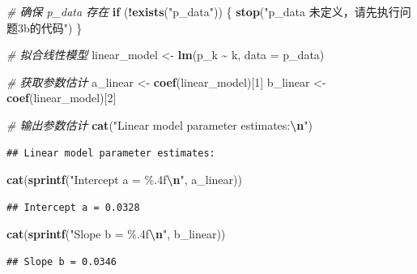 \documentclass[
]{article}
\newenvironment{Shaded}{\begin{snugshade}}{\end{snugshade}}
\newcommand{\AttributeTok}[1]{\textcolor[rgb]{0.13,0.29,0.53}{#1}}
\newcommand{\CommentTok}[1]{\textcolor[rgb]{0.56,0.35,0.01}{\textit{#1}}}
\newcommand{\ControlFlowTok}[1]{\textcolor[rgb]{0.13,0.29,0.53}{\textbf{#1}}}
\newcommand{\DecValTok}[1]{\textcolor[rgb]{0.00,0.00,0.81}{#1}}
\newcommand{\FunctionTok}[1]{\textcolor[rgb]{0.13,0.29,0.53}{\textbf{#1}}}
\newcommand{\NormalTok}[1]{#1}
\newcommand{\OtherTok}[1]{\textcolor[rgb]{0.56,0.35,0.01}{#1}}
\newcommand{\SpecialCharTok}[1]{\textcolor[rgb]{0.81,0.36,0.00}{\textbf{#1}}}
\newcommand{\StringTok}[1]{\textcolor[rgb]{0.31,0.60,0.02}{#1}}
\begin{document}
\begin{Shaded}
\begin{Highlighting}[]
\CommentTok{\# 确保 p\_data 存在}
\ControlFlowTok{if}\NormalTok{ (}\SpecialCharTok{!}\FunctionTok{exists}\NormalTok{(}\StringTok{"p\_data"}\NormalTok{)) \{}
  \FunctionTok{stop}\NormalTok{(}\StringTok{"p\_data 未定义，请先执行问题3b的代码"}\NormalTok{)}
\NormalTok{\}}

\CommentTok{\# 拟合线性模型}
\NormalTok{linear\_model }\OtherTok{\textless{}{-}} \FunctionTok{lm}\NormalTok{(p\_k }\SpecialCharTok{\textasciitilde{}}\NormalTok{ k, }\AttributeTok{data =}\NormalTok{ p\_data)}

\CommentTok{\# 获取参数估计}
\NormalTok{a\_linear }\OtherTok{\textless{}{-}} \FunctionTok{coef}\NormalTok{(linear\_model)[}\DecValTok{1}\NormalTok{]}
\NormalTok{b\_linear }\OtherTok{\textless{}{-}} \FunctionTok{coef}\NormalTok{(linear\_model)[}\DecValTok{2}\NormalTok{]}

\CommentTok{\# 输出参数估计}
\FunctionTok{cat}\NormalTok{(}\StringTok{"Linear model parameter estimates:}\SpecialCharTok{\textbackslash{}n}\StringTok{"}\NormalTok{)}
\end{Highlighting}
\end{Shaded}

\begin{verbatim}
## Linear model parameter estimates:
\end{verbatim}

\begin{Shaded}
\begin{Highlighting}[]
\FunctionTok{cat}\NormalTok{(}\FunctionTok{sprintf}\NormalTok{(}\StringTok{"Intercept a = \%.4f}\SpecialCharTok{\textbackslash{}n}\StringTok{"}\NormalTok{, a\_linear))}
\end{Highlighting}
\end{Shaded}

\begin{verbatim}
## Intercept a = 0.0328
\end{verbatim}

\begin{Shaded}
\begin{Highlighting}[]
\FunctionTok{cat}\NormalTok{(}\FunctionTok{sprintf}\NormalTok{(}\StringTok{"Slope b = \%.4f}\SpecialCharTok{\textbackslash{}n}\StringTok{"}\NormalTok{, b\_linear))}
\end{Highlighting}
\end{Shaded}

\begin{verbatim}
## Slope b = 0.0346
\end{verbatim}
\end{document}
